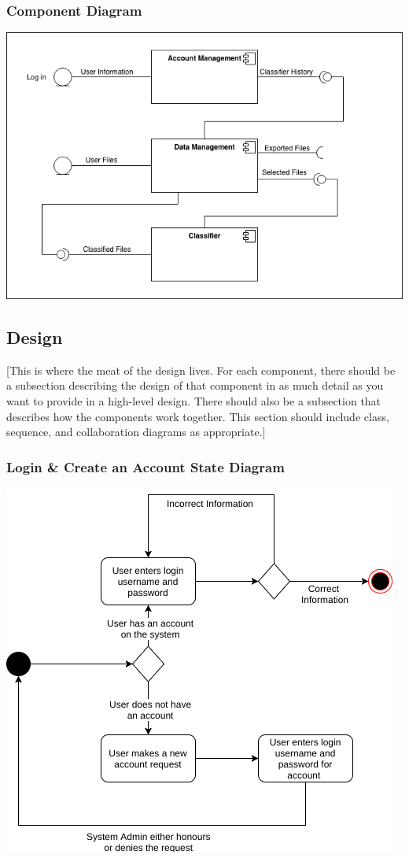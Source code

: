 \documentclass[12pt,oneside,letterpaper]{article}
\begin{document}
\subsubsection{Component Diagram}
\includegraphics[scale = 0.7]{Component_Diagram.png}
\begingroup
{}
\endgroup


\subsection{Design}
[This is where the meat of the design lives.  For each component, there should be a subsection describing the design of that component in as much detail as you want to provide in a high-level design.  There should also be a subsection that describes how the components work together. This section should include class, sequence, and collaboration diagrams as appropriate.]


\subsubsection{Login \& Create an Account State Diagram}
\includegraphics[scale = 0.7]{Veazey_Login_State.png}
\begingroup
{}
\endgroup
\end{document}
